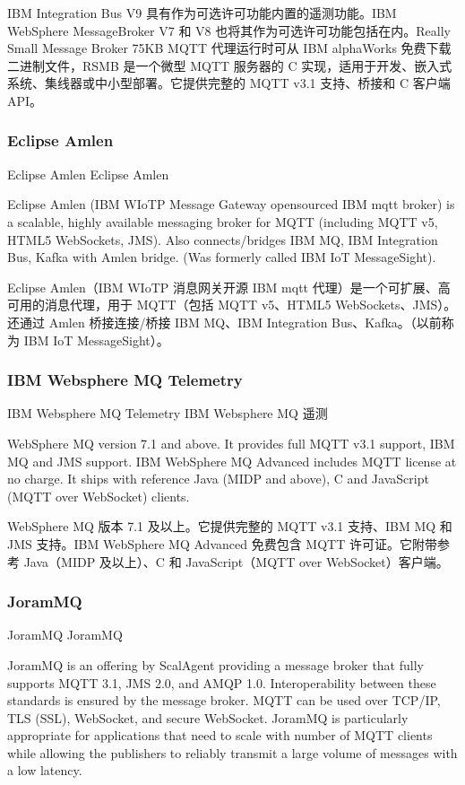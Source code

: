 \documentclass{ctexbook}
\begin{document}
IBM Integration Bus V9 具有作为可选许可功能内置的遥测功能。IBM WebSphere MessageBroker V7 和 V8 也将其作为可选许可功能包括在内。Really Small Message Broker 75KB MQTT 代理运行时可从 IBM alphaWorks 免费下载二进制文件，RSMB 是一个微型 MQTT 服务器的 C 实现，适用于开发、嵌入式系统、集线器或中小型部署。它提供完整的 MQTT v3.1 支持、桥接和 C 客户端 API。

\subsubsection{Eclipse Amlen}
Eclipse Amlen Eclipse Amlen

Eclipse Amlen (IBM WIoTP Message Gateway opensourced IBM mqtt broker) is a scalable, highly available messaging broker for MQTT (including MQTT v5, HTML5 WebSockets, JMS). Also connects/bridges IBM MQ, IBM Integration Bus, Kafka with Amlen bridge. (Was formerly called IBM IoT MessageSight).

Eclipse Amlen（IBM WIoTP 消息网关开源 IBM mqtt 代理）是一个可扩展、高可用的消息代理，用于 MQTT（包括 MQTT v5、HTML5 WebSockets、JMS）。还通过 Amlen 桥接连接/桥接 IBM MQ、IBM Integration Bus、Kafka。（以前称为 IBM IoT MessageSight）。

\subsubsection{IBM Websphere MQ Telemetry}
IBM Websphere MQ Telemetry IBM Websphere MQ 遥测

WebSphere MQ version 7.1 and above. It provides full MQTT v3.1 support, IBM MQ and JMS support. IBM WebSphere MQ Advanced includes MQTT license at no charge. It ships with reference Java (MIDP and above), C and JavaScript (MQTT over WebSocket) clients.

WebSphere MQ 版本 7.1 及以上。它提供完整的 MQTT v3.1 支持、IBM MQ 和 JMS 支持。IBM WebSphere MQ Advanced 免费包含 MQTT 许可证。它附带参考 Java（MIDP 及以上）、C 和 JavaScript（MQTT over WebSocket）客户端。

\subsubsection{JoramMQ}
JoramMQ JoramMQ

JoramMQ is an offering by ScalAgent providing a message broker that fully supports MQTT 3.1, JMS 2.0, and AMQP 1.0. Interoperability between these standards is ensured by the message broker. MQTT can be used over TCP/IP, TLS (SSL), WebSocket, and secure WebSocket. JoramMQ is particularly appropriate for applications that need to scale with number of MQTT clients while allowing the publishers to reliably transmit a large volume of messages with a low latency.
\end{document}
